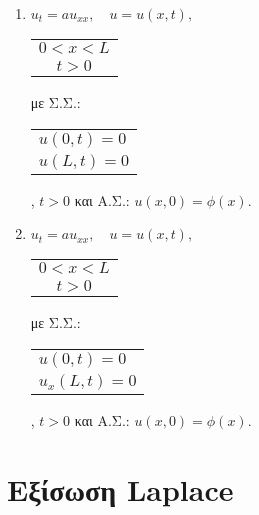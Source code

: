 \documentclass[a4paper,11pt]{report}
\begin{document}
\begin{enumerate}

  \item $ u_{t}=au_{xx}, \quad u=u(x,t), $ \quad 
    \begin{tabular}{c} $ 0<x<L $ \\ $ t>0 $ \end{tabular} 
    με Σ.Σ.: \begin{tabular}{l} $ u(0,t)=0 $ \\ $ u(L,t)=0 $ \end{tabular}, 
    $ t>0 $  και Α.Σ.:  $ u(x,0) = \phi(x) $.

  \item $ u_{t}=au_{xx}, \quad u=u(x,t), $ \quad 
    \begin{tabular}{c} $ 0<x<L $ \\ $ t>0 $ \end{tabular} 
    με Σ.Σ.: \begin{tabular}{l} $ u(0,t)=0 $ \\ $ u_{x}(L,t)=0 $ \end{tabular}, 
    $ t>0 $  και Α.Σ.:  $ u(x,0) = \phi(x) $.

\end{enumerate}


\section*{Εξίσωση Laplace}%
\end{document}
